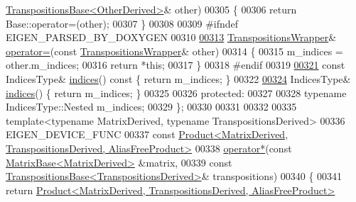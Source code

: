 \begin{DoxyCode}
      \hyperlink{class_eigen_1_1_transpositions_base}{TranspositionsBase<OtherDerived>}& other)
00305     \{
00306       \textcolor{keywordflow}{return} Base::operator=(other);
00307     \}
00308 
00309 \textcolor{preprocessor}{    #ifndef EIGEN\_PARSED\_BY\_DOXYGEN}
00310 
\hyperlink{class_eigen_1_1_transpositions_wrapper_acb74132efbe10876525cdc3d35c2d382}{00313}     \hyperlink{class_eigen_1_1_transpositions_wrapper}{TranspositionsWrapper}& \hyperlink{class_eigen_1_1_transpositions_wrapper_acb74132efbe10876525cdc3d35c2d382}{operator=}(\textcolor{keyword}{const} 
      \hyperlink{class_eigen_1_1_transpositions_wrapper}{TranspositionsWrapper}& other)
00314     \{
00315       m\_indices = other.m\_indices;
00316       \textcolor{keywordflow}{return} *\textcolor{keyword}{this};
00317     \}
00318 \textcolor{preprocessor}{    #endif}
00319 
\hyperlink{class_eigen_1_1_transpositions_wrapper_a5a64081fa7eaa0b02ec10c548505899d}{00321}     \textcolor{keyword}{const} IndicesType& \hyperlink{class_eigen_1_1_transpositions_wrapper_a5a64081fa7eaa0b02ec10c548505899d}{indices}()\textcolor{keyword}{ const }\{ \textcolor{keywordflow}{return} m\_indices; \}
00322 
\hyperlink{class_eigen_1_1_transpositions_wrapper_aab0aee4242436a7223fea797a1fa8ee9}{00324}     IndicesType& \hyperlink{class_eigen_1_1_transpositions_wrapper_aab0aee4242436a7223fea797a1fa8ee9}{indices}() \{ \textcolor{keywordflow}{return} m\_indices; \}
00325 
00326   \textcolor{keyword}{protected}:
00327 
00328     \textcolor{keyword}{typename} IndicesType::Nested m\_indices;
00329 \};
00330 
00331 
00332 
00335 \textcolor{keyword}{template}<\textcolor{keyword}{typename} MatrixDerived, \textcolor{keyword}{typename} TranspositionsDerived>
00336 EIGEN\_DEVICE\_FUNC
00337 \textcolor{keyword}{const} \hyperlink{group___core___module_class_eigen_1_1_product}{Product<MatrixDerived, TranspositionsDerived, AliasFreeProduct>}
00338 \hyperlink{namespace_eigen_a32970f7eb62fe31eeefee72d24a046d0}{operator*}(\textcolor{keyword}{const} \hyperlink{group___core___module_class_eigen_1_1_matrix_base}{MatrixBase<MatrixDerived>} &matrix,
00339           \textcolor{keyword}{const} \hyperlink{class_eigen_1_1_transpositions_base}{TranspositionsBase<TranspositionsDerived>}& 
      transpositions)
00340 \{
00341   \textcolor{keywordflow}{return} \hyperlink{group___core___module_class_eigen_1_1_product}{Product<MatrixDerived, TranspositionsDerived, AliasFreeProduct>}

\end{DoxyCode}
